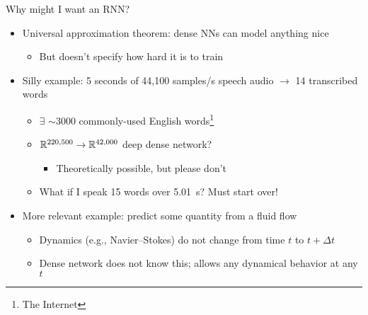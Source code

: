 \begin{frame}{Why might I want an RNN?}
    \begin{itemize}
        \item<+-> Universal approximation theorem: dense NNs can model anything nice
        \begin{itemize}
            \item But doesn't specify how hard it is to train
        \end{itemize}
        \item<+-> Silly example: 5 seconds of 44,100 samples/s speech audio $\rightarrow$ 14 transcribed words
        \begin{itemize}
            \item $\exists$ $\sim$3000 commonly-used English words\footnote{The Internet}
            \item $\mathbb{R}^{220,500} \to \mathbb{R}^{42,000}$ deep dense network?
            \begin{itemize}
                \item Theoretically possible, but please don't
            \end{itemize}
            \item What if I speak 15 words over 5.01~s?
            Must start over!
        \end{itemize}
        \item<+-> More relevant example: predict some quantity from a fluid flow
        \begin{itemize}
            \item Dynamics (e.g., Navier--Stokes) do not change from time $t$ to $t + \Delta t$
            \item Dense network does not know this; allows any dynamical behavior at any $t$
        \end{itemize}
    \end{itemize}
\end{frame}

